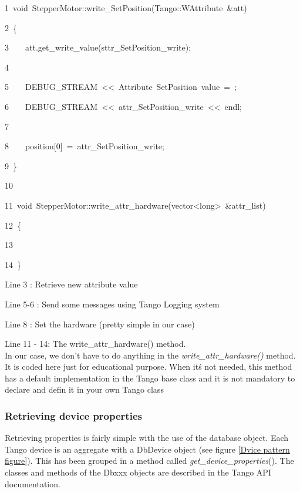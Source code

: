 
\begin{lyxcode}
1~void~StepperMotor::write\_SetPosition(Tango::WAttribute~\&att)

2~\{

3~~~~att.get\_write\_value(sttr\_SetPosition\_write);

4~

5~~~~DEBUG\_STREAM~<\textcompwordmark{}<~\textquotedbl{}Attribute~SetPosition~value~=~\textquotedbl{};

6~~~~DEBUG\_STREAM~<\textcompwordmark{}<~attr\_SetPosition\_write~<\textcompwordmark{}<~endl;

7~

8~~~~position{[}0{]}~=~attr\_SetPosition\_write;

9~\}

10~

11~void~StepperMotor::write\_attr\_hardware(vector<long>~\&attr\_list)

12~\{

13~

14~\}
\end{lyxcode}


Line 3 : Retrieve new attribute value

Line 5-6 : Send some messages using Tango Logging system

Line 8 : Set the hardware (pretty simple in our case)

Line 11 - 14: The write\_attr\_hardware() method. \\

In our case, we don't have to do anything in the \emph{write\_attr\_hardware()}
method. It is coded here just for educational purpose. When it\'{s}
not needed, this method has a default implementation in the Tango
base class and it is not mandatory to declare and defin it in your
own Tango class

\subsubsection{Retrieving device properties}

Retrieving properties is fairly simple with the
use of the database object. Each Tango device is an aggregate with
a DbDevice object (see figure \ref{Dvice pattern figure}). This has
been grouped in a method called \emph{get\_device\_properties}().
The classes and methods of the Dbxxx objects are described in the
Tango API documentation.

